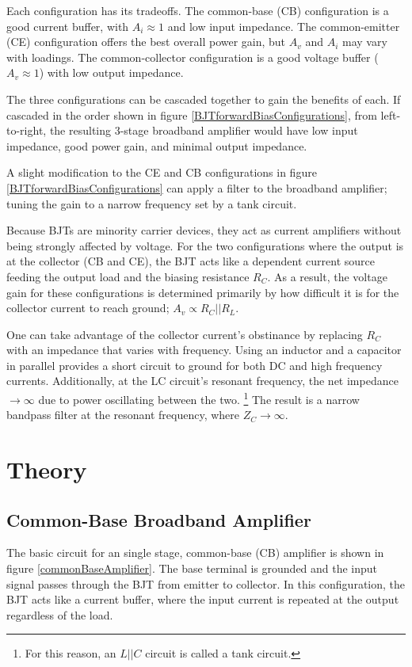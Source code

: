 \documentclass[titlepage, letterpaper, 11pt]{article}
\begin{document}
Each configuration has its tradeoffs. The common-base (CB) configuration is
a good current buffer, with $A_{i}\approx1$ and low input impedance.
The common-emitter (CE) configuration offers the best overall power gain,
but $A_{v}$ and $A_{i}$ may vary with loadings. The common-collector
configuration is a good voltage buffer 
($A_{v}\approx1$) with low output impedance.

The three configurations can be cascaded together to gain the benefits
of each. If cascaded in the order shown in figure 
\ref{BJTforwardBiasConfigurations}, from left-to-right, the resulting
3-stage broadband amplifier would have low input impedance, good power
gain, and minimal output impedance.

A slight modification to the CE and CB configurations in figure
\ref{BJTforwardBiasConfigurations} can apply a filter to the broadband
amplifier; tuning the gain to a narrow frequency set by a tank circuit. 

Because BJTs are minority carrier devices, they act as current amplifiers
without being strongly affected by voltage. For the two configurations
where the output is at the collector (CB and CE), the BJT acts like a
dependent current source feeding the output load and the biasing
resistance $R_{C}$. As a result, the voltage gain for these
configurations is determined primarily by how difficult it is for
the collector current to reach ground; $A_{v}\propto R_{C}||R_{L}$.

One can take advantage of the collector current's obstinance
by replacing $R_{C}$ with an impedance that varies with frequency.
Using an inductor and a capacitor in parallel provides a short circuit
to ground for both DC and high frequency currents. Additionally, at the
LC circuit's resonant frequency, the net impedance $\rightarrow \infty$
due to power oscillating between the two.
\footnote{For this reason, an $L||C$ circuit is called a tank circuit.}
The result is a narrow bandpass filter at the resonant frequency, 
where $Z_{C}\rightarrow \infty$.

\section{Theory}

\subsection{Common-Base Broadband Amplifier}

The basic circuit for an single stage, common-base (CB) amplifier is
shown in figure \ref{commonBaseAmplifier}. The base terminal is
grounded and the input signal passes through the BJT from emitter
to collector. In this configuration, the BJT acts like a current
buffer, where the input current is repeated at the output regardless
of the load. 
\end{document}
